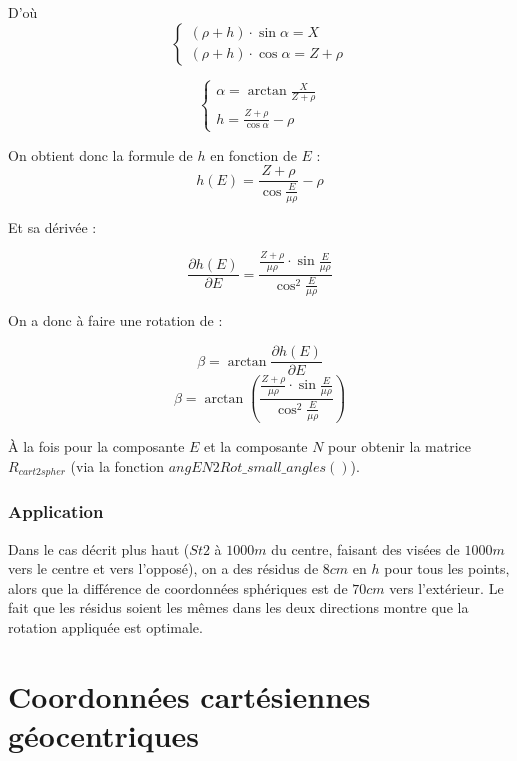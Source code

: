 \documentclass[french]{report}
\begin{document}
D'où
$$\left\{
    \begin{array}{ll}
        \left(\rho+h\right) \cdot \sin{\alpha} = X  \\
        \left(\rho+h\right) \cdot \cos{\alpha} = Z + \rho 
\end{array}
\right.$$


$$\left\{
    \begin{array}{ll}
        \alpha = \arctan{\frac{X}{Z + \rho}}  \\
        h = \frac{Z + \rho}{\cos{\alpha}} - \rho
\end{array}
\right.$$

On obtient donc la formule de $h$ en fonction de $E$ :
$$ h(E) = \frac{Z + \rho}{\cos{\frac{E}{\mu \rho}}} - \rho $$


Et sa dérivée :

 $$ \frac{\partial h(E)}{\partial E} = \frac{ \frac{Z+\rho}{\mu \rho} \cdot \sin\frac{E}{\mu \rho}}{\cos^2\frac{E}{\mu \rho}} $$

On a donc à faire une rotation de :

 $$ \beta = \arctan \frac{\partial h(E)}{\partial E} $$
 $$ \beta = \arctan  \left(\frac{ \frac{Z+\rho}{\mu \rho} \cdot \sin\frac{E}{\mu \rho}}{\cos^2\frac{E}{\mu \rho}}\right) $$
 
À la fois pour la composante $E$ et la composante $N$ pour obtenir la matrice $R_{cart2spher}$
(via la fonction $angEN2Rot\_small\_angles()$).


\subsubsection{Application}


Dans le cas décrit plus haut ($St2$ à $1000m$ du centre, faisant des visées de $1000m$ vers le centre
et vers l'opposé), on a des résidus de $8cm$ en $h$ pour tous les points, alors que la différence
de coordonnées sphériques est de $70cm$ vers l'extérieur.
Le fait que les résidus soient les mêmes dans les deux directions montre que la rotation appliquée
est optimale.


\section{Coordonnées cartésiennes géocentriques}
\end{document}

